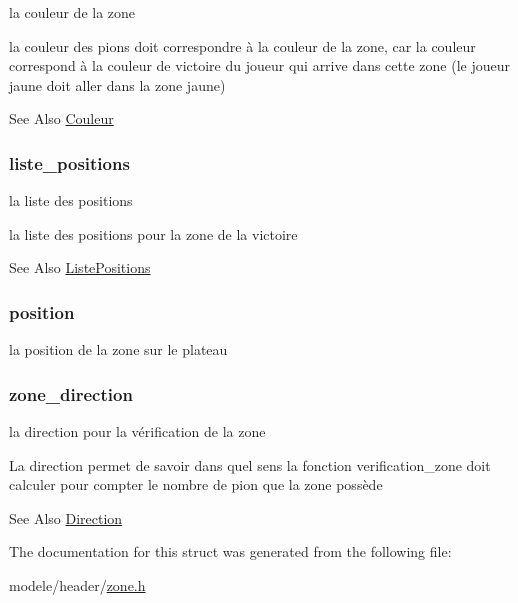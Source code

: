 la couleur de la zone 

la couleur des pions doit correspondre à la couleur de la zone, car la couleur correspond à la couleur de victoire du joueur qui arrive dans cette zone (le joueur jaune doit aller dans la zone jaune) \begin{DoxySeeAlso}{See Also}
\hyperlink{couleur_8h_a297c7f13df924dd6c731cb40f9fff63c}{Couleur} 
\end{DoxySeeAlso}
\hypertarget{struct_zone_a2336e623c3d6d88cb83d7bf8408b3595}{
\subsubsection[{liste\-\_\-positions}]{ liste\-\_\-positions}}\label{struct_zone_a2336e623c3d6d88cb83d7bf8408b3595}


la liste des positions 

la liste des positions pour la zone de la victoire \begin{DoxySeeAlso}{See Also}
\hyperlink{struct_liste_positions}{Liste\-Positions} 
\end{DoxySeeAlso}
\hypertarget{struct_zone_ad87e572069283c424e2d7c151ce04605}{
\subsubsection[{position}]{ position}}\label{struct_zone_ad87e572069283c424e2d7c151ce04605}


la position de la zone sur le plateau 

\hypertarget{struct_zone_a1db1a3431f9c0ab20b1dad0cb24c6f13}{
\subsubsection[{zone\-\_\-direction}]{ zone\-\_\-direction}}\label{struct_zone_a1db1a3431f9c0ab20b1dad0cb24c6f13}


la direction pour la vérification de la zone 

La direction permet de savoir dans quel sens la fonction verification\-\_\-zone doit calculer pour compter le nombre de pion que la zone possède \begin{DoxySeeAlso}{See Also}
\hyperlink{direction_8h_ad196bf510b28a9ba4c872e96dfd16f92}{Direction} 
\end{DoxySeeAlso}


The documentation for this struct was generated from the following file\-:\begin{DoxyCompactItemize}
\item 
modele/header/\hyperlink{zone_8h}{zone.\-h}\end{DoxyCompactItemize}
